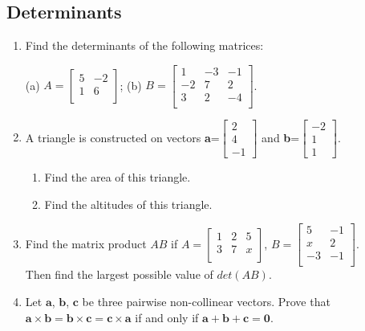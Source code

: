 \documentclass[a4paper,10pt]{article}
\begin{document}
\subsection{Determinants}
\begin{enumerate}
\item
Find the determinants of the following matrices:

(a) $A=\begin{bmatrix}
          5 & -2 \\
          1 & 6 \\
        \end{bmatrix}$;
(b) $B=\begin{bmatrix}
           1 & -3 & -1 \\
           -2 & 7 & 2 \\
           3 & 2 & -4 \\
         \end{bmatrix}$.
\item
A triangle is constructed on vectors \textbf{a}=$\begin{bmatrix} 2 \\ 4 \\ -1  \end{bmatrix}$ and \textbf{b}=$\begin{bmatrix} -2\\ 1 \\ 1  \end{bmatrix}$.
\begin{enumerate}
    \item Find the area of this triangle.
    \item Find the altitudes of this triangle.
\end{enumerate}

\item Find the matrix product $AB$ if $A=\begin{bmatrix}
          1 & 2 & 5 \\
          3 & 7 & x \\
        \end{bmatrix}$, $B=\begin{bmatrix}
           5 & -1 \\
           x & 2 \\
           -3 & -1 \\
         \end{bmatrix}$.\\ Then find the largest possible value of $det(AB)$.
         
\item
Let $\textbf{a}$, $\textbf{b}$, $\textbf{c}$ be three pairwise non-collinear vectors. Prove that $\textbf{a}\times\textbf{b}=\textbf{b}\times\textbf{c}=\textbf{c}\times\textbf{a}$ if and only if $\textbf{a}+\textbf{b}+\textbf{c}=\textbf{0}$.

\end{enumerate}
\end{document}
